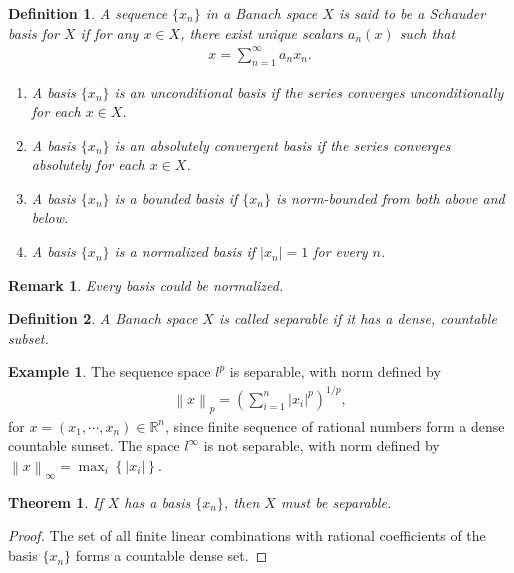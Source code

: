 \documentclass[11pt]{book}
\newtheorem{definition}{Definition}[chapter]
\newtheorem{theorem}{Theorem}[chapter]
\newtheorem{remark}{Remark}[chapter]
\theoremstyle{definition}
\newtheorem{example}{Example}[chapter]
\numberwithin{equation}{chapter}
\begin{document}
\begin{definition}
A sequence $\{x_n\}$ in a Banach space $X$ is said to be a Schauder basis for $X$ if for any $x \in X$, there exist unique scalars $a_n(x)$ such that
\begin{align*}
    x = \sum^\infty_{n = 1} a_n x_n.
\end{align*}
\begin{enumerate}[label=(\alph*)]
    \item A basis $\{x_n\}$ is an unconditional basis if the series converges unconditionally for each $x \in X$.
    
    \item A basis $\{x_n\}$ is an absolutely convergent basis if the series converges absolutely for each $x \in X$.
    
    \item A basis $\{x_n\}$ is a bounded basis if $\{x_n\}$ is norm-bounded from both above and below.
    
    \item A basis $\{x_n\}$ is a normalized basis if $\left|x_n\right| = 1$ for every $n$.
\end{enumerate}
\end{definition}

\begin{remark}
Every basis could be normalized.
\end{remark}

\begin{definition}
A Banach space $X$ is called separable if it has a dense, countable subset.
\end{definition}

\medskip

\begin{example}
The sequence space $l^p$ is separable, with norm defined by
\begin{align*}
    \left\|x\right\|_p = \left(\sum^n_{i=1} \left|x_i\right|^p\right)^{1/p},
\end{align*}
for $x = (x_1, \cdots, x_n) \in \mathbb{R}^n$, since finite sequence of rational numbers form a dense countable sunset. The space $l^\infty$ is not separable, with norm defined by $\left\|x\right\|_\infty = \max_i \left\{\left|x_i\right|\right\}$.
\end{example}

\medskip

\begin{theorem}
If $X$ has a basis $\{x_n\}$, then $X$ must be separable.
\end{theorem}
\begin{proof}
The set of all finite linear combinations with rational coefficients of the basis $\{x_n\}$ forms a countable dense set.
\end{proof}
\end{document}
